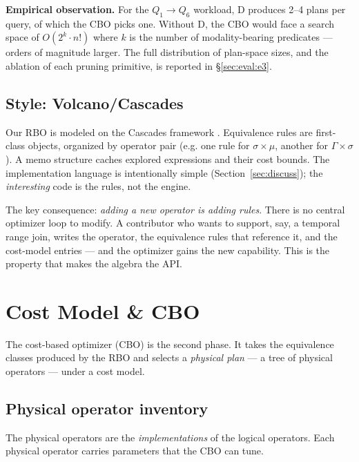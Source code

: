 \documentclass[sigconf,nonacm,review]{acmart}
\theoremstyle{plain}
\theoremstyle{definition}
\theoremstyle{remark}
\begin{document}
\noindent\textbf{Empirical observation.}
For the $Q_1 \to Q_6$ workload, D produces 2--4 plans per
query, of which the CBO picks one. Without D, the CBO would
face a search space of $O(2^k \cdot n!)$ where $k$ is the
number of modality-bearing predicates --- orders of magnitude
larger. The full distribution of plan-space sizes, and the
ablation of each pruning primitive, is reported in
\S\ref{sec:eval:e3}.

\subsection{Style: Volcano/Cascades}

Our RBO is modeled on the Cascades framework \cite{graefe1995}.
Equivalence rules are first-class objects, organized by operator
pair (e.g. one rule for $\sigma \times \mu$, another for $\Gamma
\times \sigma$). A memo structure caches explored expressions and
their cost bounds. The implementation language is intentionally
simple (Section~\ref{sec:discuss}); the \emph{interesting} code is the
rules, not the engine.

The key consequence: \emph{adding a new operator is adding rules}.
There is no central optimizer loop to modify. A contributor who
wants to support, say, a temporal range join, writes the operator,
the equivalence rules that reference it, and the cost-model entries
--- and the optimizer gains the new capability. This is the property
that makes the algebra the API.

\section{Cost Model \& CBO}\label{sec:cbo}

The cost-based optimizer (CBO) is the second phase. It takes the
equivalence classes produced by the RBO and selects a \emph{physical
plan} --- a tree of physical operators --- under a cost model.

\subsection{Physical operator inventory}

The physical operators are the \emph{implementations} of the logical
operators. Each physical operator carries parameters that the CBO
can tune.
\end{document}

